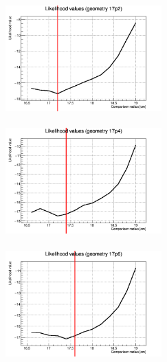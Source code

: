 \documentclass[a4paper, 11pt]{report}
\begin{document}
\begin{figure}[htbp]
\begin{minipage}[b]{.32\textwidth}
\includegraphics[width=6cm, height=4.6cm]{figs/likelihood100LowStat/likelihood17p2.png}
\end{minipage}\hfill
\begin{minipage}[b]{.32\textwidth}
\includegraphics[width=6cm, height=4.6cm]{figs/likelihood100LowStat/likelihood17p4.png}
\end{minipage} \hfill
\begin{minipage}[b]{.32\textwidth}
\includegraphics[width=6cm, height=4.6cm]{figs/likelihood100LowStat/likelihood17p6.png}
\end{minipage} \hfill \vspace{10pt}


\end{figure}
\end{document}
